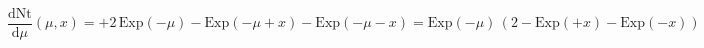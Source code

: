 \documentclass[preview]{standalone}
\begin{document}
\begin{equation}
\tag{31}
    \frac{\mathrm{d}\mathrm{Nt}}{\mathrm{d}\mu} ( \mu , x ) = + 2 \, \mathrm{Exp} ( - \mu ) - \mathrm{Exp} ( - \mu + x ) - \mathrm{Exp} ( - \mu - x ) = \mathrm{Exp} ( - \mu ) \, ( 2 - \mathrm{Exp} ( + x ) - \mathrm{Exp} ( - x ) )
\end{equation}
\end{document}
